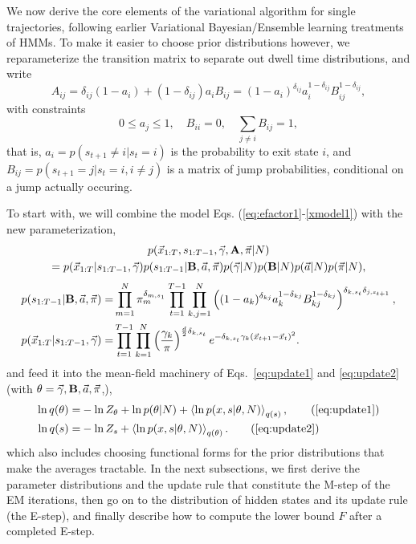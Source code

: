 We now derive the core elements of the variational algorithm for
single trajectories, following earlier Variational Bayesian/Ensemble
learning treatments of HMMs\cite{Bronson2010,Mackay1997,Beal2003}.  To
make it easier to choose prior distributions however, we
reparameterize the transition matrix to separate out dwell time
distributions, and write
\begin{equation}\label{eq:aBdef}
A_{ij}=\delta_{ij}(1-a_i)+(1-\delta_{ij})a_iB_{ij}=
(1-a_i)^{\delta_{ij}}a_i^{1-\delta_{ij}}B_{ij}^{1-\delta_{ij}},
\end{equation}
with constraints
\begin{equation}
0\le a_j\le 1,\quad B_{ii}=0,\quad \sum_{j\ne i}B_{ij}=1,
\end{equation}
that is, $a_i=p(s_{t+1}\ne i|s_t=i)$ is the probability to exit state $i$, and
$B_{ij}=p(s_{t+1}=j|s_t=i,i\ne j)$ is a matrix of jump probabilities,
conditional on a jump actually occuring.


To start with, we will combine the model
Eqs. (\ref{eq:efactor1}-\ref{xmodel1}) with the new parameterization,
\begin{multline}
\label{eq:efactor1b}
p(\vec{x}_{1:T},s_{1:T-1},\vec{\gamma},\mathbf{A},\vec\pi|N)\\
=p(\vec{x}_{1:T}|s_{1:T-1},\vec{\gamma})
p(s_{1:T-1}|\mathbf{B},\vec{a},\vec\pi)
p(\vec{\gamma}|N)p(\mathbf{B}|N)p(\vec{a}|N)p(\vec\pi|N),
\end{multline}
\begin{align}
\label{smodel1b}
  p(s_{1:T-1}|\mathbf{B},\vec a,\vec{\pi})=&
  \prod_{m=1}^N\pi_m^{\delta_{m,s_1}}
  \prod_{t=1}^{T-1}\prod_{k,j=1}^N 
  \left((1-a_k)^{\delta_{kj}}a_k^{1-\delta_{kj}}
  B_{kj}^{1-\delta_{kj}}\right)^{\delta_{k,s_t}\delta_{j,s_{t+1}}},\\
    \label{xmodel1b}
    p(\vec{x}_{1:T}|s_{1:T-1},\vec\gamma)=&
    \prod_{t=1}^{T-1}\prod_{k=1}^N\left(
    \frac{\gamma_k}{\pi}\right)^{\frac d2\delta_{k,s_t}}
    e^{-\delta_{k,s_t}\gamma_k(\vec{x}_{t+1}-\vec{x}_t)^2}. 
\end{align}
and feed it into the mean-field machinery of Eqs.~\eqref{eq:update1}
and \eqref{eq:update2} (with
$\theta=\vec{\gamma},\mathbf{B},\vec{a},\vec{\pi}$,),
\begin{align}
  \ln q(\theta)=&-\ln Z_\theta+\ln p(\theta|N)
  +\mean{\ln p(x,s|\theta,N)}_{q(s)},\tag{\ref{eq:update1}}\\
  \ln q(s)=&-\ln Z_s+\mean{\ln p(x,s|\theta,N)}_{q(\theta)}.
\tag{\ref{eq:update2}}
\end{align}
which also includes choosing functional forms for the prior
distributions that make the averages tractable. In the next
subsections, we first derive the parameter distributions and the
update rule that constitute the M-step of the EM iterations, then go on
to the distribution of hidden states and its update rule (the E-step),
and finally describe how to compute the lower bound $F$ after a
completed E-step.

